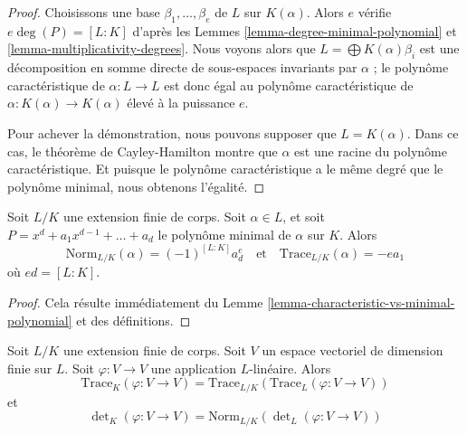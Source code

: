 \begin{proof}
Choisissons une base $\beta_1, \ldots, \beta_e$ de $L$ sur $K(\alpha)$.
Alors $e$ vérifie $e \deg(P) = [L : K]$ d'après les
Lemmes \ref{lemma-degree-minimal-polynomial} et
\ref{lemma-multiplicativity-degrees}.
Nous voyons alors que $L = \bigoplus K(\alpha) \beta_i$ est une
décomposition en somme directe de sous-espaces invariants par $\alpha$ ;
le polynôme caractéristique de $\alpha : L \to L$
est donc égal au polynôme caractéristique de
$\alpha : K(\alpha) \to K(\alpha)$ élevé à la puissance $e$.

\medskip\noindent
Pour achever la démonstration, nous pouvons supposer que $L = K(\alpha)$.
Dans ce cas, le théorème de Cayley-Hamilton montre que $\alpha$
est une racine du polynôme caractéristique. Et puisque le
polynôme caractéristique a le même degré que le polynôme
minimal, nous obtenons l'égalité.
\end{proof}

\begin{lemma}
\label{lemma-trace-and-norm-from-minimal-polynomial}
Soit $L/K$ une extension finie de corps. Soit $\alpha \in L$, et soit
$P = x^d + a_1 x^{d - 1} + \ldots + a_d$
le polynôme minimal de $\alpha$ sur $K$. Alors
$$
\text{Norm}_{L/K}(\alpha) = (-1)^{[L : K]} a_d^e
\quad\text{et}\quad
\text{Trace}_{L/K}(\alpha) = - e a_1
$$
où $e d = [L : K]$.
\end{lemma}

\begin{proof}
Cela résulte immédiatement du Lemme \ref{lemma-characteristic-vs-minimal-polynomial}
et des définitions.
\end{proof}

\begin{lemma}
\label{lemma-trace-and-norm-linear}
Soit $L/K$ une extension finie de corps. Soit $V$ un espace vectoriel de dimension
finie sur $L$. Soit $\varphi : V \to V$ une application $L$-linéaire.
Alors
$$
\text{Trace}_K(\varphi : V \to V) =
\text{Trace}_{L/K}(\text{Trace}_L(\varphi : V \to V))
$$
et
$$
\det\nolimits_K(\varphi : V \to V) =
\text{Norm}_{L/K}(\det\nolimits_L(\varphi : V \to V))
$$
\end{lemma}

